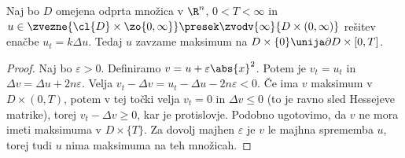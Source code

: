 
\begin{izrek}
  Naj bo $D$ omejena odprta množica v $\R^n$, $0 < T < \infty$ in $u \in
  \zvezne{\cl{D} \times \zo{0, \infty}} \presek \zvodv{\infty}{D \times (0,
	\infty)}$ rešitev enačbe $u_t = k \Delta u$.
  Tedaj $u$ zavzame maksimum na $D \times \{0\} \unija \partial D \times [0,T]$.
\end{izrek}

\begin{proof}
  Naj bo $\varepsilon > 0$.
  Definiramo $v = u + \varepsilon \abs{x}^2$.
  Potem je $v_t = u_t$ in $\Delta v = \Delta u + 2 n \varepsilon$.
  Velja $v_t - \Delta v = u_t - \Delta u - 2 n \varepsilon < 0$.
  Če ima $v$ maksimum v $D \times (0,T)$, potem v tej točki velja $v_t = 0$ in
  $\Delta v \le 0$ (to je ravno sled Hessejeve matrike), torej $v_t - \Delta v
  \ge 0$, kar je protislovje.
  Podobno ugotovimo, da $v$ ne mora imeti maksimuma v $D \times \{T\}$.
  Za dovolj majhen $\varepsilon$ je $v$ le majhna sprememba $u$, torej tudi $u$
  nima maksimuma na teh množicah.
\end{proof}




